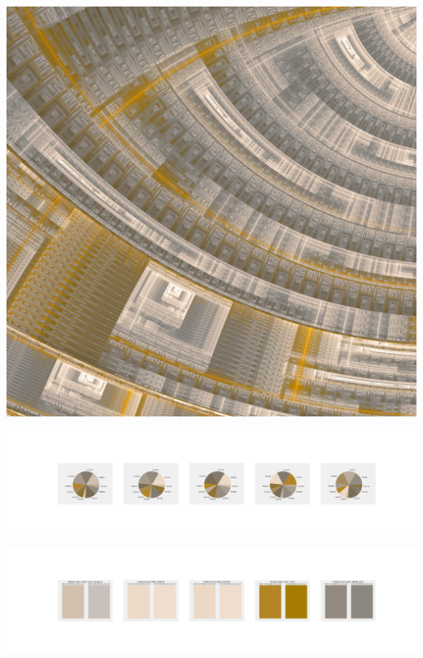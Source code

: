 \documentclass[11pt]{article}
\begin{document}
\begin{landscape}
    \begin{center}
    \includegraphics[width=\textwidth]{./nbimg/file (450).jpg}
    \end{center}

    \begin{center}
    \includegraphics[width=250mm]{./nbimg/pie-390.jpg}
    \end{center}

    \begin{center}
    \includegraphics[width=250mm]{./nbimg/peak-390.jpg}
    \end{center}
    


\end{landscape}
\end{document}
